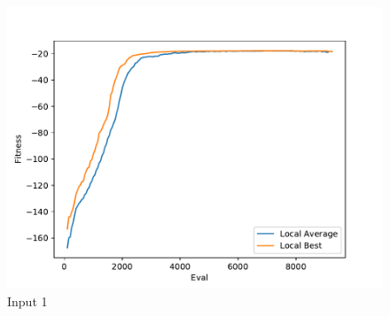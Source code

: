 \documentclass{standalone}
\begin{document}
\begin{figure}[!htb]
	\caption{Input 1}
	\label{fig:graph_1020}
	\includegraphics[width=\textwidth]{../graphs/graphs/1020.pdf}
\end{figure}
\end{document}
